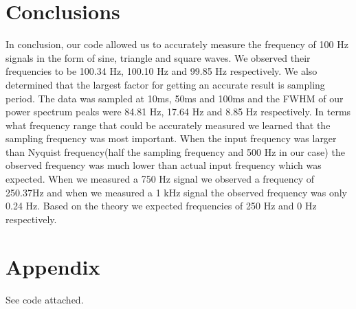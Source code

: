 \documentclass{article}
\begin{document}
\section{Conclusions}

In conclusion, our code allowed us to accurately measure the frequency of 100 Hz signals in the form of sine, triangle and square waves.  We observed their frequencies to be 100.34 Hz, 100.10 Hz and 99.85 Hz respectively.  We also determined that the largest factor for getting an accurate result is sampling period.  The data was sampled at 10ms, 50ms and 100ms and the FWHM of our power spectrum peaks were 84.81 Hz, 17.64 Hz and 8.85 Hz respectively.  In terms what frequency range that could be accurately measured we learned that the sampling frequency was most important.  When the input frequency was larger than Nyquist frequency(half the sampling frequency and 500 Hz in our case)  the observed frequency was much lower than actual input frequency which was expected.  When we measured a 750 Hz signal we observed a frequency of 250.37Hz and when we measured a 1 kHz signal the observed frequency was only 0.24 Hz.  Based on the theory we expected frequencies of 250 Hz and 0 Hz respectively. 

\section{Appendix}

See code attached.
\end{document}
